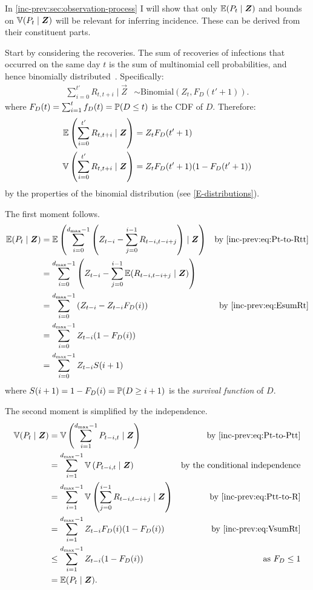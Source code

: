 \documentclass[thesis.tex]{subfiles}
\begin{document}
In \cref{inc-prev:sec:observation-process} I will show that only $\operatorname{\mathbb{E}}(P_t \mid \bm{Z})$ and bounds on $\operatorname{\mathbb{V}}(P_t \mid \bm{Z})$ will be relevant for inferring incidence.
These can be derived from their constituent parts.

Start by considering the recoveries.
The sum of recoveries of infections that occurred on the same day $t$ is the sum of multinomial cell probabilities, and hence binomially distributed~\autocite{alamAnalysis}.
Specifically:
\begin{align}
  \sum_{i=0}^{t'} R_{t,t+i} \mid \vec{Z} &\sim \text{Binomial}(Z_t, F_D(t'+1)). \label{inc-prev:eq:binomialRt}
\end{align}
where $F_D(t) = \sum_{i=1}^t f_D(t) = \operatorname{\mathbb{P}}(D \leq t)$ is the CDF of $D$.
Therefore:
\begin{align}
  \operatorname{\mathbb{E}} \left( \sum_{i=0}^{t'} R_{t,t+i} \mid \bm{Z} \right) &= Z_t F_D(t'+1) \label{inc-prev:eq:EsumRt} \\
  \operatorname{\mathbb{V}} \left( \sum_{i=0}^{t'} R_{t,t+i} \mid \bm{Z} \right) &= Z_t F_D(t'+1) (1 - F_D(t'+1)) \label{inc-prev:eq:VsumRt}
\end{align}
by the properties of the binomial distribution (see \cref{E-distributions}).

The first moment follows.
\begin{align}
\E(P_t \mid \vec{Z})
  &= \E\left(\sum_{i=0}^{d_\text{max}-1} \left( Z_{t-i} - \sum_{j=0}^{i-1} R_{t-i,t-i+j} \right) \mid \vec{Z} \right) &\text{by \cref{inc-prev:eq:Pt-to-Rtt}}\\
  &= \sum_{i=0}^{d_\text{max}-1} \left( Z_{t-i} - \sum_{j=0}^{i-1} \E( R_{t-i,t-i+j} \mid \vec{Z}) \right) \\
  &= \sum_{i=0}^{d_\text{max}-1} \left( Z_{t-i} - Z_{t-i} F_D(i) \right) &\text{by \cref{inc-prev:eq:EsumRt}}\\
  &= \sum_{i=0}^{d_\text{max}-1} Z_{t-i} (1 - F_D(i)) \\
  &= \sum_{i=0}^{d_\text{max}-1} Z_{t-i} S(i+1) \label{inc-prev:eq:EPt}
\end{align}
where $S(i+1) = 1-F_D(i) = \operatorname{\mathbb{P}}(D \geq i+1)$ is the \emph{survival function} of $D$.

The second moment is simplified by the independence.
\begin{align}
\V(P_t \mid \vec{Z})
  &= \V\left(\sum_{i=1}^{d_\text{max}-1} P_{t-i,t} \mid \vec{Z} \right) &\text{by \cref{inc-prev:eq:Pt-to-Ptt}} \\
  &= \sum_{i=1}^{d_\text{max}-1} \V\left(P_{t-i,t} \mid \vec{Z} \right) &\text{by the conditional independence} \\
  &= \sum_{i=1}^{d_\text{max}-1} \V\left(\sum_{j=0}^{i-1} R_{t-i,t-i+j} \mid \vec{Z} \right) &\text{by~\cref{inc-prev:eq:Ptt-to-R}}\\
  &= \sum_{i=1}^{d_\text{max}-1} Z_{t-i} F_D(i) (1 - F_D(i)) &\text{by~\cref{inc-prev:eq:VsumRt}} \\
  &\leq \sum_{i=1}^{d_\text{max}-1} Z_{t-i} (1 - F_D(i)) &\text{as $F_D \leq 1$}\\
  &= \E(P_t \mid \vec{Z}). \label{inc-prev:eq:boundVPt}
\end{align}
\end{document}
